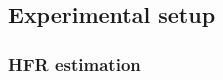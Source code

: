 \documentclass{article}
\newcommand{\rjtcomment}[1]{{\color{purple}[RJT: #1]}}
\begin{document}





\subsection{Experimental setup}\label{sec:setup}
\subsubsection{HFR estimation}
\end{document}
